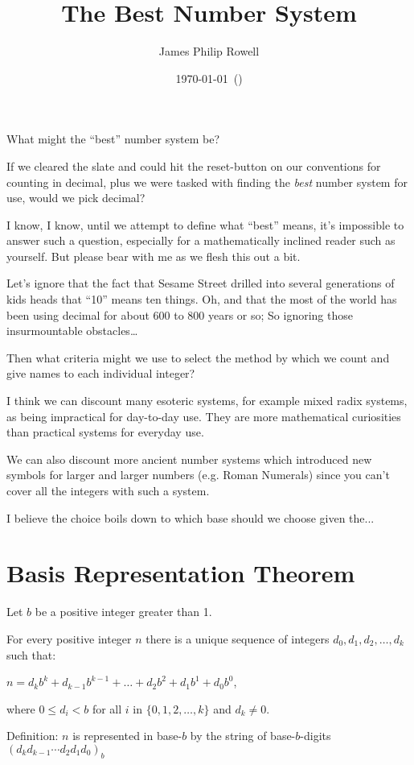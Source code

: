 \documentclass{article}
\title{\vspace{-1.5cm}The Best Number System}
\author{James Philip Rowell}
\date{\vspace{-0.5cm}\footnotesize\today\ (\jprVersion)} %
\newenvironment{jprIn}{\begin{adjustwidth}{2em}{}}{\end{adjustwidth}}
\begin{document}
\maketitle
\begin{em}
\centerline{\small{}What might the ``best'' number system be?}
\end{em}

If we cleared the slate and could hit the reset-button on our conventions for
counting in decimal, plus we were tasked with finding the \emph{best} number system for use,
would we pick decimal?

I know, I know, until we attempt to define what ``best'' means, it's impossible to
answer such a question, especially for a mathematically inclined reader such as yourself.
But please bear with me as we flesh this out a bit.

Let's ignore that the fact
that Sesame Street drilled into several generations of kids heads
that ``10'' means ten things. Oh, and that the most of the world 
has been using decimal for about 600 to 800 years or so; So ignoring those
insurmountable obstacles\dots{}

Then what criteria might we use to select the method by which we count
and give names to each individual integer?

I think we can discount many esoteric systems, for example mixed radix systems, as
being impractical for day-to-day use. They are more mathematical curiosities than
practical systems for everyday use.

We can also discount more ancient number systems which introduced
new symbols for larger and larger numbers (e.g. Roman Numerals) since you can't cover
all the integers with such a system.

I believe the choice boils down to which base should we choose given the...

\section*{Basis Representation Theorem}
\begin{jprIn}
Let $b$ be a positive integer greater than 1.

For every positive integer $n$ there is a unique sequence
of integers $d_0, d_1, d_2,\dots{},d_k$ such that:

\hspace{3em}$n=d_kb^k+d_{k-1}b^{k-1}+\dots+d_2b^2+d_1b^1+d_0b^0$,

where $0\le{}d_i<b$ for all $i$ in $\{0,1,2,\dots{},k\}$ and $d_k\ne0$.

Definition: $n$ is represented in base-$b$ by the string
of base-$b$-digits $(d_kd_{k-1}{\cdots}d_2d_1d_0)_b$
\end{jprIn}
\end{document}

